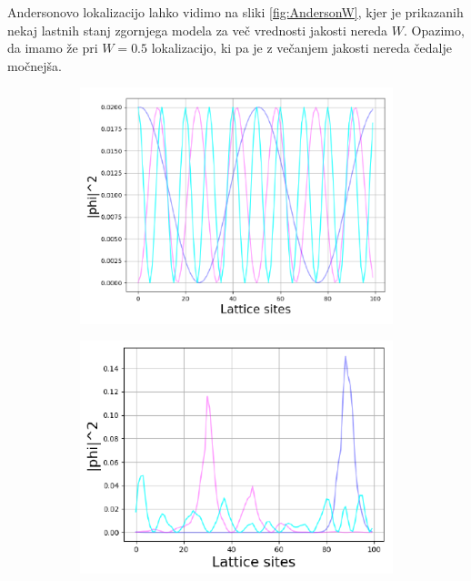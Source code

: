 Andersonovo lokalizacijo lahko vidimo na sliki \ref{fig:AndersonW}, kjer je prikazanih nekaj lastnih stanj zgornjega modela za več vrednosti jakosti nereda $W$. Opazimo, da imamo že pri $W=0.5$ lokalizacijo, ki pa je z večanjem jakosti nereda čedalje močnejša.
\begin{figure}[!h]
\centering
\begin{subfigure}{.33\textwidth}
\includegraphics[trim={13 14 0 0},clip,width=\linewidth]{Figures/AndersonBloch.pdf}
\end{subfigure}
\begin{subfigure}{.32\textwidth}
\includegraphics[trim={15 14 0 0},clip,width=\linewidth]{Figures/Anderson05.pdf}
\end{subfigure}

\end{figure}
